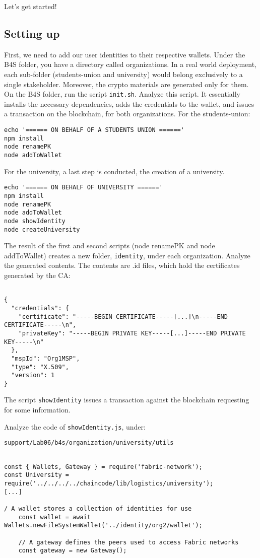 \documentclass[12pt,a4paper]{article}
\theoremstyle{definition}
\begin{document}
Let's get started!

\subsection{Setting up}
First, we need to add our user identities to their respective wallets. Under the B4S folder, you have a directory called organizations. In a real world deployment, each sub-folder (students-union and university) would belong exclusively to a single stakeholder. Moreover, the crypto materials are generated only for them. On the B4S folder, run the script \texttt{init.sh}. Analyze this script. It essentially installs the necessary dependencies, adds the credentials to the wallet, and issues a transaction on the blockchain, for both organizations. For the students-union:

\begin{verbatim}
echo '====== ON BEHALF OF A STUDENTS UNION ======'
npm install
node renamePK
node addToWallet
\end{verbatim}

For the university, a last step is conducted, the creation of a university.
\begin{verbatim}
echo '====== ON BEHALF OF UNIVERSITY ======'
npm install
node renamePK
node addToWallet
node showIdentity
node createUniversity
\end{verbatim}


The result of the first and second scripts (node renamePK and node addToWallet) creates a new folder, \texttt{identity}, under each organization. Analyze the generated contents. The contents are .id files, which hold the certificates generated by the CA:

\begin{verbatim}

{
  "credentials": {
    "certificate": "-----BEGIN CERTIFICATE-----[...]\n-----END CERTIFICATE-----\n",
    "privateKey": "-----BEGIN PRIVATE KEY-----[...]-----END PRIVATE KEY-----\n"
  },
  "mspId": "Org1MSP",
  "type": "X.509",
  "version": 1
}
\end{verbatim}

The script \texttt{showIdentity} issues a transaction against the blockchain requesting for some information.

Analyze the code of \texttt{showIdentity.js}, under:

\texttt{support/Lab06/b4s/organization/university/utils}

\begin{verbatim}

const { Wallets, Gateway } = require('fabric-network');
const University = require('../../../../chaincode/lib/logistics/university');
[...]

/ A wallet stores a collection of identities for use
    const wallet = await Wallets.newFileSystemWallet('../identity/org2/wallet');

    // A gateway defines the peers used to access Fabric networks
    const gateway = new Gateway();
\end{verbatim}
\end{document}
